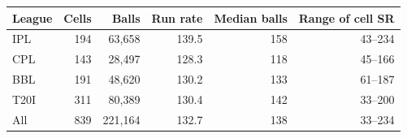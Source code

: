 \begin{tabular}{lrrrrr}
\toprule
League & Cells & Balls & Run rate & Median balls & Range of cell SR \\
\midrule
IPL & 194 & 63,658 & 139.5 & 158 & 43--234 \\
CPL & 143 & 28,497 & 128.3 & 118 & 45--166 \\
BBL & 191 & 48,620 & 130.2 & 133 & 61--187 \\
T20I & 311 & 80,389 & 130.4 & 142 & 33--200 \\
\midrule All & 839 & 221,164 & 132.7 & 138 & 33--234 \\
\bottomrule
\end{tabular}
